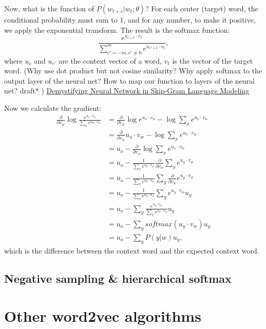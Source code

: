 \documentclass{report}
\begin{document}
	Now, what is the function of $P(w_{t+c} | w_t; \theta)$? For each center (target) word, the conditional probability must sum to 1, and for any number, to make it positive, we apply the exponential transform. The result is the softmax function: 
	\[
		\frac{e^{u_{c + t} \cdot v_t}}{\sum_{c' = -m, c' \neq 0}^{m} e^{u_{c' + t} \cdot v_t}}
	,\] where $u_c$ and $u_{c'}$ are the context vector of a word, $v_t$ is the vector of the target word. (Why use dot product but not cosine similarity? Why apply softmax to the output layer of the neural net? How to map our function to layers of the neural net? draft* ) \href{https://aegis4048.github.io/demystifying_neural_network_in_skip_gram_language_modeling}{Demystifying Neural Network in Skip-Gram Language Modeling}

Now we calculate the gradient:
\begin{align*}
	\frac{\partial}{\partial v_w} \log
	\frac{e^{u_o \cdot v_w}}{\sum_{x} e^{u_x \cdot v_w}} &= \frac{\partial}{\partial v_w} \log e^{u_o \cdot v_w} - \log \sum_{x} e^{u_x \cdot v_w} \\
									  &= \frac{\partial }{\partial v_w} u_o \cdot v_w -  \log \sum_{x} e^{u_{x} \cdot v_w} \\
									  &= u_o - \frac{\partial }{\partial v_w} \log \sum_{x} e^{u_x \cdot v_w} \\
									  &= u_o - \frac{1}{\sum_{x} e^{u_x \cdot v_w}} \frac{\partial }{\partial v_w} \sum_{y} e^{u_y \cdot v_w} \\
									  &= u_o - \frac{1}{\sum_{x} e^{u_x \cdot v_w}}  \sum_{y} \frac{\partial }{\partial v_w} e^{u_y \cdot v_w} \\ 
									  &= u_o - \frac{1}{\sum_{x} e^{u_x \cdot v_w}}  \sum_{y} e^{u_y \cdot v_w} u_y \\ 
									  &= u_o - \sum_{y}  \frac{e^{u_y \cdot v_w}}{\sum_{x} e^{u_x \cdot v_w}} u_y \\
									  &= u_o - \sum_{y} softmax(u_y \cdot v_w) u_y \\
									  &= u_o - \sum_{y} P(y|w) u_y
,\end{align*}
which is the difference between the context word and the expected context word.
\subsection{Negative sampling \& hierarchical softmax}

\section{Other word2vec algorithms}
\end{document}
